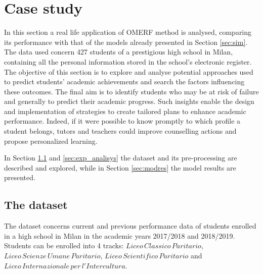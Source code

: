 \section{Case study}
\label{sec:case}
In this section a real life application of OMERF method is analysed, comparing its performance with that of the models already presented in Section \ref{sec:sim}.
The data used concern 427 students of a prestigious high school in Milan, containing  all the personal information stored in the school's electronic register.
The objective of this section is to explore and analyse potential approaches used to predict students' academic achievements and search the factors influencing these outcomes.
The final aim is to identify students who may be at risk of failure and generally to predict their academic progress.
Such insights enable the design and implementation of strategies to create tailored plans to enhance academic performance. Indeed, if it were possible to know promptly to which profile a student belongs, tutors and teachers could improve counselling actions and propose personalized learning.

In Section \ref{sec:dataset} and \ref{sec:exp_analisys} the dataset and its pre-processing are described and explored, while in Section \ref{sec:modres} the model results are presented.

\subsection{The dataset}
\label{sec:dataset}
The dataset concerns current and previous performance data of students enrolled in a high school in Milan in the academic years 2017/2018 and 2018/2019.
Students can be enrolled into 4 tracks: \(Liceo \, Classico \, Paritario\), \(Liceo \, Scienze \, Umane \, Paritario\), \(Liceo \, Scientifico \, Paritario\) and \(Liceo \, Internazionale \, per \, l'Intercultura\).


